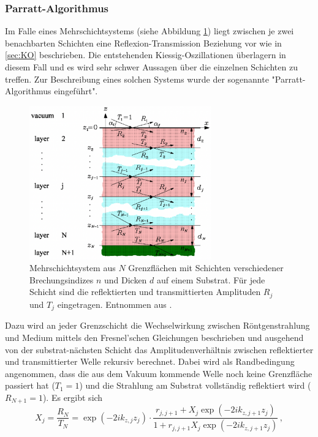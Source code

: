         \subsubsection{Parratt-Algorithmus}
            Im Falle eines Mehrschichtsystems (siehe Abbildung \ref{fig:Parratt}) liegt zwischen je zwei benachbarten Schichten eine Reflexion-Transmission Beziehung vor wie in \ref{sec:KO} beschrieben.
            Die entstehenden Kiessig-Oszillationen überlagern in diesem Fall und es wird sehr schwer Aussagen über die einzelnen Schichten zu treffen.
            Zur Beschreibung eines solchen Systems wurde der sogenannte "Parratt-Algorithmus eingeführt".
            \begin{figure}[h]
                \centering
                \includegraphics[width = 0.7\textwidth]{pictures/Parratt.png}
                \caption{Mehrschichtsystem aus $N$ Grenzflächen mit Schichten verschiedener Brechungsindizes $n$ und Dicken $d$ auf einem Substrat.
                        Für jede Schicht sind die reflektierten und transmittierten Amplituden $R_j$ und $T_j$ eingetragen. Entnommen aus \cite{e1_tu_dortmund_versuchsanleitung_nodate}.}
                \label{fig:Parratt}
            \end{figure}
            Dazu wird an jeder Grenzschicht die Wechselwirkung zwischen Röntgenstrahlung und Medium mittels den Fresnel'schen Gleichungen beschrieben
            und ausgehend von der substrat-nächsten Schicht das Amplitudenverhältnis zwischen reflektierter und transmittierter Welle rekursiv berechnet.
            Dabei wird als Randbedingung angenommen, dass die aus dem Vakuum kommende Welle noch keine Grenzfläche passiert hat ($T_1=1$)
            und die Strahlung am Substrat vollständig reflektiert wird ($R_{N+1}=1$).
            Es ergibt sich
            \begin{equation}
                X_j=\frac{R_N}{T_N}=\exp\left(-2ik_{z,j}z_j\right)\cdot\frac{r_{j,j+1}+X_j\exp\left(-2ik_{z,j+1}z_j\right)}{1+r_{j,j+1}X_j\exp\left(-2ik_{z,j+1}z_j\right)} \, ,
                \label{eqn:X_j}
            \end{equation}
